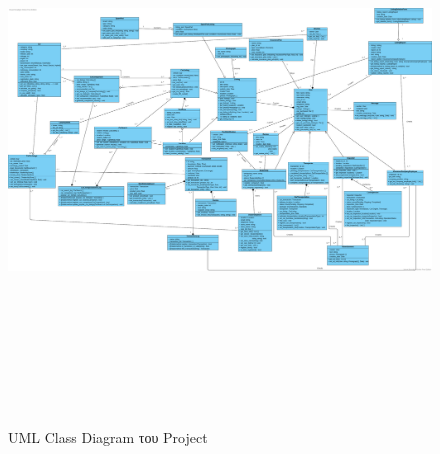 \documentclass{../ol-softwaremanual}
\begin{document}
	\begin{figure}[htbp!]		
		\includegraphics[width=\textwidth+3.4cm, height=15cm]{img/class_diagram_v0.2.png}
		\caption{\en UML Class Diagram \gr του \en Project \gr}
	\end{figure}
	
	
	
	\newpage
	
	
\end{document}
